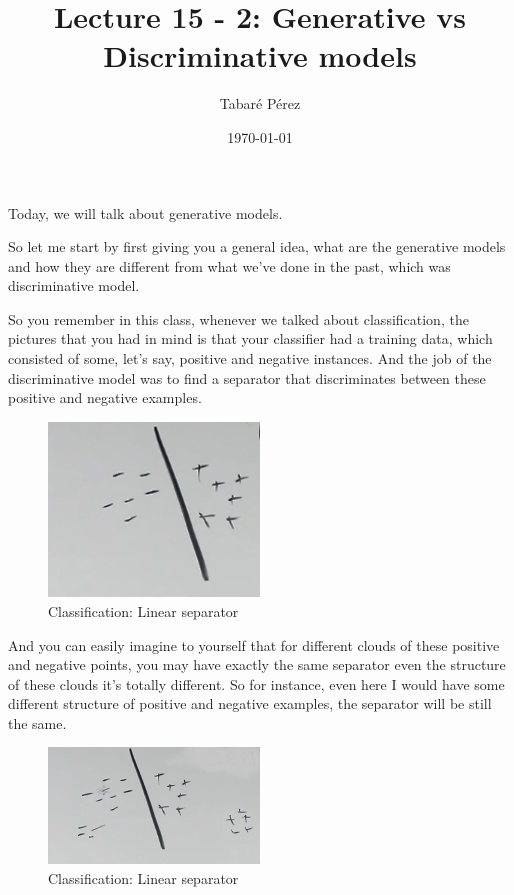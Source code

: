 \documentclass[a4paper, 12pt]{article}
\author{Tabaré Pérez}
\date{\today}
\title{Lecture 15 - 2: Generative vs Discriminative models}
\begin{document}
\maketitle
Today, we will talk about generative models.

So let me start by first giving you a general idea, what are the generative
models and how they are different from what we've done in the past, which was
discriminative model.

So you remember in this class, whenever we talked about classification, the
pictures that you had in mind is that your classifier had a training data, which
consisted of some, let's say, positive and negative instances. And the job of
the discriminative model was to find a separator that discriminates between
these positive and negative examples.

\begin{figure}[H]
\centering
\includegraphics[width=0.5\textwidth]{./pic/u04-02-fig-01.png}
\caption{\label{fig:org569e0f0}Classification: Linear separator}
\end{figure}

And you can easily imagine to yourself that for different clouds of these
positive and negative points, you may have exactly the same separator even the
structure of these clouds it's totally different. So for instance, even here I
would have some different structure of positive and negative examples, the
separator will be still the same.

\begin{figure}[H]
\centering
\includegraphics[width=0.5\textwidth]{./pic/u04-02-fig-02.png}
\caption{\label{fig:org46aad67}Classification: Linear separator}
\end{figure}
\end{document}
